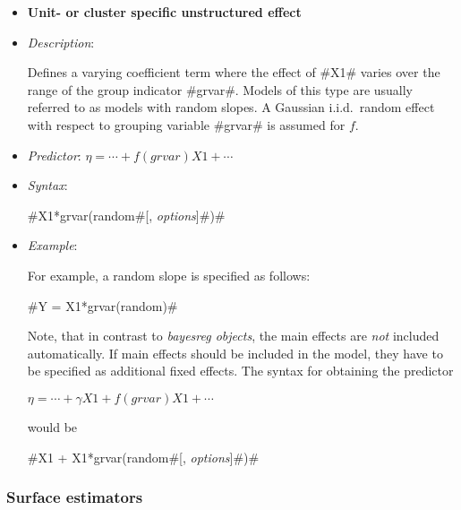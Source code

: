 \begin{itemize}
\item[]{\bf\sffamily Unit- or cluster specific unstructured
effect}

\item[] {\em Description}:

Defines a varying coefficient term where the effect of #X1# varies
over the range of the group indicator #grvar#. Models of this type
are usually referred to as models with random slopes. A Gaussian
i.i.d.~random effect with respect to grouping variable #grvar# is
assumed for $f$.
\item[] {\em Predictor}: $\eta = \cdots + f(grvar)X1 + \cdots$
\item[] {\em Syntax}:

#X1*grvar(random#[, {\em options}]#)#
\item[] {\em Example}:

For example, a random slope is specified as follows:

#Y = X1*grvar(random)#

Note, that in contrast to {\em bayesreg objects}, the main effects
are {\em not} included automatically. If main effects should be
included in the model, they have to be specified as additional
fixed effects. The syntax for obtaining the predictor

$\eta = \cdots + \gamma X1 + f(grvar)X1 + \cdots$

would be

#X1 + X1*grvar(random#[, {\em options}]#)#

\end{itemize}

\subsubsection*{Surface estimators}

